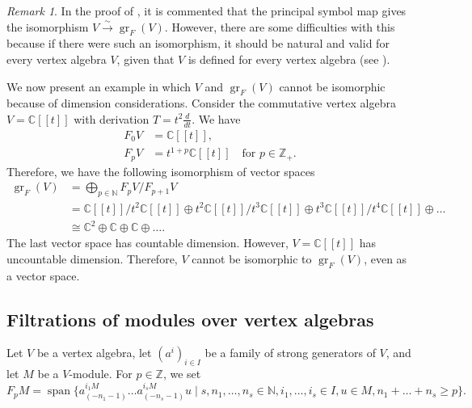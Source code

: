 \documentclass[a4paper, 12pt, reqno]{amsart}
\theoremstyle{remark}
\newtheorem{remark}[theorem]{Remark}
\numberwithin{equation}{subsection}
\DeclareMathOperator{\gr}{gr}
\DeclareMathOperator{\vspan}{span}
\begin{document}
\begin{remark}
  \label{rmk:38}
  In the proof of \cite[Corollary 2.6.2]{arakawa_remark_2012}, it is commented that the principal symbol map gives the isomorphism $V \xrightarrow{\sim} \gr_F(V)$.
  However, there are some difficulties with this because if there were such an isomorphism, it should be natural and valid for every vertex algebra $V$, given that $V$ is defined for every vertex algebra (see ).
  
  We now present an example in which $V$ and $\gr_F(V)$ cannot be isomorphic because of dimension considerations.
  Consider the commutative vertex algebra $V = \mathbb{C}[[t]]$ with derivation $T = t^2\frac{d}{dt}$.
  We have
  \begin{align*}
    F_0V &= \mathbb{C}[[t]], \\
    F_pV &= t^{1 + p}\mathbb{C}[[t]] \quad \text{for }p \in \mathbb{Z}_+.
  \end{align*}
  Therefore, we have the following isomorphism of vector spaces
  \begin{align*}
    \gr_F(V) &= \bigoplus_{p \in \mathbb{N}}F_pV/F_{p + 1}V \\
    &= \mathbb{C}[[t]]/t^2\mathbb{C}[[t]] \oplus t^2\mathbb{C}[[t]]/t^3\mathbb{C}[[t]] \oplus t^3\mathbb{C}[[t]]/t^4\mathbb{C}[[t]] \oplus \dots \\
    &\cong \mathbb{C}^2 \oplus \mathbb{C} \oplus \mathbb{C} \oplus \dots.
  \end{align*}
  The last vector space has countable dimension.
  However, $V = \mathbb{C}[[t]]$ has uncountable dimension.
  Therefore, $V$ cannot be isomorphic to $\gr_F(V)$, even as a vector space.
\end{remark}

\subsection{Filtrations of modules over vertex algebras}
\label{sec:filtr-modul-over}

Let $V$ be a vertex algebra, let $(a^i)_{i \in I}$ be a family of strong generators of $V$, and let $M$ be a $V$-module.
For $p \in \mathbb{Z}$, we set
\begin{equation*}
  F_pM = \vspan\{a^{i_1M}_{(-n_1 - 1)}\dots a^{i_sM}_{(-n_s - 1)}u \mid s, n_1, \dots, n_s \in \mathbb{N}, i_1, \dots, i_s \in I, u \in M, n_1 + \dots + n_s \ge p\}.
\end{equation*}
\end{document}
